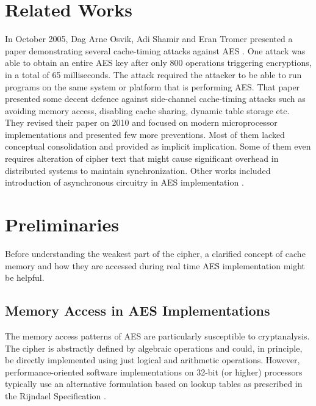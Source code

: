 \documentclass[3p]{elsarticle}
\begin{document}
\section{Related Works}

In October 2005, Dag Arne Osvik, Adi Shamir and Eran Tromer presented a paper demonstrating several cache-timing attacks against AES \cite{osvikold}. One attack was able to obtain an entire AES key after only 800 operations triggering encryptions, in a total of 65 milliseconds. The attack required the attacker to be able to run programs on the same system or platform that is performing AES. That paper presented some decent defence against side-channel cache-timing attacks such as avoiding memory access, disabling cache sharing, dynamic table storage etc.\\

They revised their paper on 2010 \cite{osvik} and focused on modern microprocessor implementations and presented few more preventions. Most of them lacked conceptual consolidation and provided as implicit implication. Some of them even requires alteration of cipher text that might cause significant overhead in distributed systems to maintain synchronization. Other works included introduction of asynchronous circuitry in AES implementation \cite{spadavecchia2006network}.\\


\section{Preliminaries}

Before understanding the weakest part of the cipher, a clarified concept of cache memory and how they are accessed during real time AES implementation might be helpful.\\

\subsection{Memory Access in AES Implementations}

The memory access patterns of AES are particularly susceptible to cryptanalysis. The cipher is abstractly defined by algebraic operations and could, in principle, be directly implemented using just logical and arithmetic operations. However, performance-oriented software implementations on 32-bit (or higher) processors typically use an alternative formulation based on lookup tables as prescribed in the Rijndael Specification \citep{daemen2002design}.\\
\end{document}

